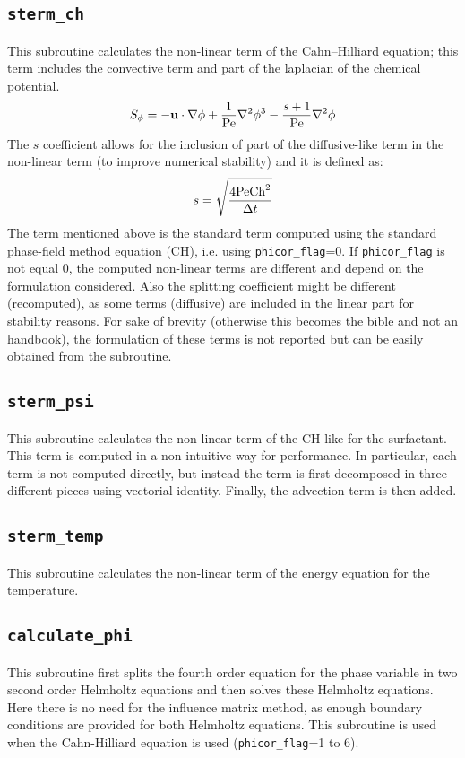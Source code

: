 \subsection{\texttt{sterm\_ch}}
This subroutine calculates the non-linear term of the Cahn--Hilliard equation; this term includes the convective term and part of the laplacian of the chemical potential. 
\[
S_\phi=-\mathbf{u}\cdot\nabla\phi+\frac{1}{\textnormal{Pe}}\nabla^2\phi^3-\frac{s+1}{\textnormal{Pe}}\nabla^2\phi
\]
The $s$ coefficient allows for the inclusion of part of the diffusive-like term in the non-linear term (to improve numerical stability) and it is defined as:
\[
s=\sqrt{\frac{4\textnormal{Pe}\textnormal{Ch}^2}{\Delta t}}
\]
The term mentioned above is the standard term computed using the standard phase-field method equation (CH), i.e. using \texttt{phicor\_flag}=0.
If \texttt{phicor\_flag} is not equal 0, the computed non-linear terms are different and depend on the formulation considered.
Also the splitting coefficient might be different (recomputed), as some terms (diffusive) are included in the linear part for stability reasons.
For sake of brevity (otherwise this becomes the bible and not an handbook), the formulation of these terms is not reported but can be easily obtained from the subroutine. 

\subsection{\texttt{sterm\_psi}}
This subroutine calculates the non-linear term of the CH-like for the surfactant.
This term is computed in a non-intuitive way for performance.
In particular, each term is not computed directly, but instead the term is first decomposed in three different pieces using vectorial identity.
Finally, the advection term is then added.

\subsection{\texttt{sterm\_temp}}
This subroutine calculates the non-linear term of the energy equation for the temperature.



\subsection{\texttt{calculate\_phi}}
This subroutine first splits the fourth order equation for the phase variable in two second order Helmholtz equations and then solves these Helmholtz equations. Here there is no need for the influence matrix method, as enough boundary conditions are provided for both Helmholtz equations.
This subroutine is used when the Cahn-Hilliard equation is used (\texttt{phicor\_flag}=1 to 6).

